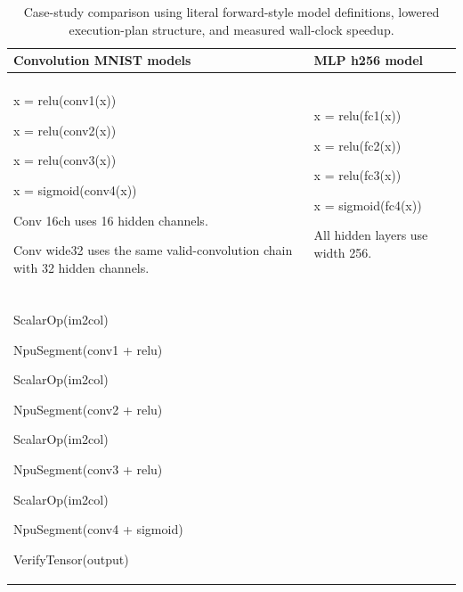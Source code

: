 \documentclass[a4paper, 12pt, titlepage]{article}
\begin{document}
\begin{table}[H]
    \centering
    \footnotesize
    \caption{Case-study comparison using literal forward-style model definitions, lowered execution-plan structure, and measured wall-clock speedup.}
    \label{tab:mlp-conv-plan}
    \begin{tabularx}{\textwidth}{|>{\raggedright\arraybackslash}X|>{\raggedright\arraybackslash}X|}
        \hline
        \textbf{Convolution MNIST models} & \textbf{MLP h256 model} \\
        \hline
        \multicolumn{2}{|l|}{\textbf{Forward definition}} \\
        \hline
        {\ttfamily\small
        x = relu(conv1(x))\par
        x = relu(conv2(x))\par
        x = relu(conv3(x))\par
        x = sigmoid(conv4(x))\par
        \vspace{0.25em}
        Conv 16ch uses 16 hidden channels.\par
        Conv wide32 uses the same valid-convolution chain with 32 hidden channels.\par
        }
        &
        {\ttfamily\small
        x = relu(fc1(x))\par
        x = relu(fc2(x))\par
        x = relu(fc3(x))\par
        x = sigmoid(fc4(x))\par
        \vspace{0.25em}
        All hidden layers use width 256.\par
        } \\
        \hline
        \multicolumn{2}{|l|}{\textbf{Lowered execution plan}} \\
        \hline
        {\ttfamily\small
        ScalarOp(im2col)\par
        NpuSegment(conv1 + relu)\par
        ScalarOp(im2col)\par
        NpuSegment(conv2 + relu)\par
        ScalarOp(im2col)\par
        NpuSegment(conv3 + relu)\par
        ScalarOp(im2col)\par
        NpuSegment(conv4 + sigmoid)\par
        VerifyTensor(output)\par
}
\end{tabularx}
\end{table}
\end{document}
